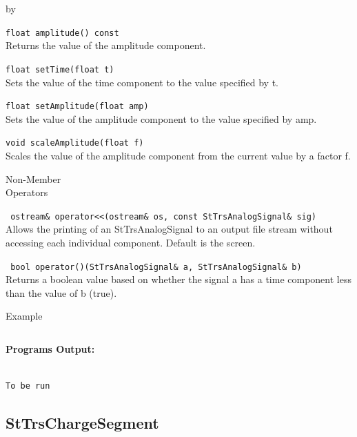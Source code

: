 \documentclass[twoside]{article}
\newcommand{\entrylabel}[1]{\mbox{\textbf{{#1}}}\hfil}%
\newenvironment{entry}
{\begin{list}{}%
    {\renewcommand{\makelabel}{\entrylabel}%
     \setlength{\labelwidth}{90pt}%
     \setlength{\leftmargin}{\labelwidth}
     \advance\leftmargin by \labelsep%
      }%
    }%
  {\end{list}}
\newcommand{\Entrylabel}[1]%
{\raisebox{0pt}[1ex][0pt]{\makebox[\labelwidth][l]%
    {\parbox[t]{\labelwidth}{\hspace{0pt}\textbf{{#1}}}}}}
\newenvironment{Entry}%
{\renewcommand{\entrylabel}{\Entrylabel}\begin{entry}}%
  {\end{entry}}
\begin{document}
\begin{Entry}
  \verb+float amplitude() const+\\
  Returns the value of the amplitude component.

  \verb+float setTime(float t)+\\
  Sets the value of the time component to the value specified by t.

  \verb+float setAmplitude(float amp)+\\
  Sets the value of the amplitude component to the value specified by amp.

  \verb+void scaleAmplitude(float f)+\\
  Scales the value of the amplitude component from the current value
  by a factor f.


\item[Non-Member \\ Operators]

  \verb+ ostream& operator<<(ostream& os, const StTrsAnalogSignal& sig)+\\
  Allows the printing of an StTrsAnalogSignal to an output file stream
  without accessing each individual component.  Default is the screen.

  \verb+ bool operator()(StTrsAnalogSignal& a, StTrsAnalogSignal& b)+\\
  Returns a boolean value based on whether the signal a has a time
  component less than the value of b (true).
  
\item[Example]

{\footnotesize
\begin{verbatim}

\end{verbatim}
}%
{\bf Programs Output:}
{\footnotesize
\begin{verbatim}

To be run

\end{verbatim}
} %

\end{Entry}
\clearpage

%
%
\subsection{StTrsChargeSegment} 
\label{sec:stTrsChargeSegment}
\end{document}
